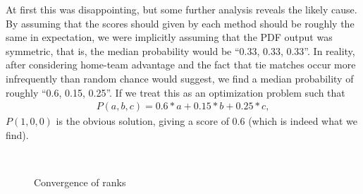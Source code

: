 \documentclass{llncs}
\begin{document}
At first this was disappointing, but some further analysis reveals the likely cause. By assuming that the scores should given by each method should be roughly the same in expectation, we were implicitly assuming that the PDF output was symmetric, that is, the median probability would be ``0.33, 0.33, 0.33''. In reality, after considering home-team advantage and the fact that tie matches occur more infrequently than random chance would suggest, we find a median probability of roughly ``0.6, 0.15, 0.25''. If we treat this as an optimization problem such that
\begin{align*}
    P(a,b,c) = 0.6*a + 0.15*b + 0.25*c,
\end{align*}
$P(1,0,0)$ is the obvious solution, giving a score of 0.6 (which
is indeed what we find).

\begin{figure}
    \begin{center}
        \\
    \end{center}
    \caption{Convergence of ranks}
    \label{fig:rankconvergence}
\end{figure}
\end{document}
